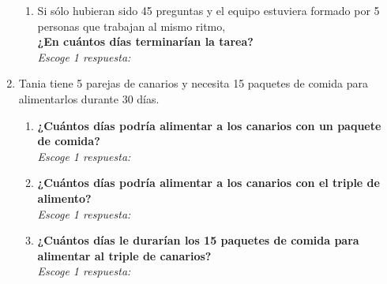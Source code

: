 \documentclass[11pt]{book}
\begin{document}
\begin{enumerate}
\begin{enumerate}
          \item Si sólo hubieran sido 45 preguntas y el equipo estuviera formado por 5 personas que trabajan al mismo ritmo, \\
                \textbf{¿En cuántos días terminarían la tarea?}\\
                \emph{Escoge 1 respuesta:}

        \end{enumerate}

  \item Tania tiene 5 parejas de canarios y necesita 15 paquetes de comida para alimentarlos durante 30 días.

        \begin{enumerate}
          \item \textbf{¿Cuántos días podría alimentar a los canarios con un paquete de comida?}\\
                \emph{Escoge 1 respuesta:}

          \item \textbf{¿Cuántos días podría alimentar a los canarios con el triple de alimento?}\\
                \emph{Escoge 1 respuesta:}

          \item \textbf{¿Cuántos días le durarían los 15 paquetes de comida para alimentar al triple de canarios?}\\
                \emph{Escoge 1 respuesta:}


\end{enumerate}
\end{enumerate}
\end{document}

